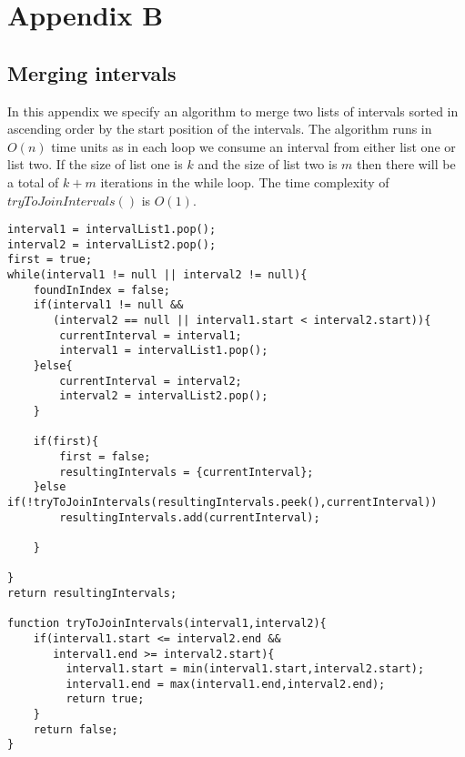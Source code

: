 \chapter{Appendix B}
\section{Merging intervals}

In this appendix we specify an algorithm to merge two lists of intervals sorted in ascending order by the start position of the intervals. The algorithm runs in $O(n)$ time units as in each loop we consume an interval from either list one or list two. If the size of list one is $k$ and the size of list two is $m$ then there will be a total of $k+m$ iterations in the while loop. The time complexity of $tryToJoinIntervals()$ is $O(1)$.

\begin{lstlisting}
interval1 = intervalList1.pop();
interval2 = intervalList2.pop();
first = true;
while(interval1 != null || interval2 != null){
    foundInIndex = false;
    if(interval1 != null && 
       (interval2 == null || interval1.start < interval2.start)){
        currentInterval = interval1;
        interval1 = intervalList1.pop();
    }else{
        currentInterval = interval2;
        interval2 = intervalList2.pop();
    }
    
    if(first){
        first = false;
        resultingIntervals = {currentInterval};
    }else if(!tryToJoinIntervals(resultingIntervals.peek(),currentInterval))
        resultingIntervals.add(currentInterval);
        
    }
        
}
return resultingIntervals;

function tryToJoinIntervals(interval1,interval2){
    if(interval1.start <= interval2.end && 
       interval1.end >= interval2.start){
         interval1.start = min(interval1.start,interval2.start);
         interval1.end = max(interval1.end,interval2.end);
         return true;
    }
    return false;
}
\end{lstlisting}